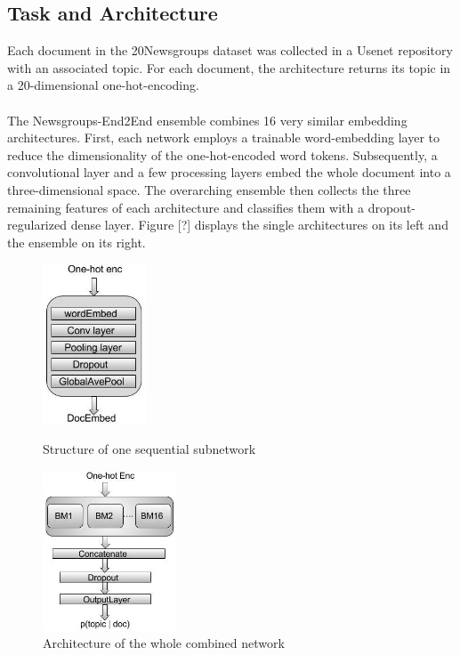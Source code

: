 \subsection*{Task and Architecture}
Each document in the 20Newsgroups dataset was collected in a Usenet repository with an associated topic. For each document, the architecture returns its topic in a 20-dimensional one-hot-encoding.\\
\\
The Newsgroups-End2End ensemble combines 16 very similar embedding architectures. First, each network employs a trainable word-embedding layer to reduce the dimensionality of the one-hot-encoded word tokens. Subsequently, a convolutional layer and a few processing layers embed the whole document into a three-dimensional space. The overarching ensemble then collects the three remaining features of each architecture and classifies them with a dropout-regularized dense layer. Figure [?] displays the single architectures on its left and the ensemble on its right.
\begin{figure}
	\begin{minipage}{0.5\textwidth}
		\centering
		\includegraphics[height=180px]{gfx/4-Design/base_module.png}
		\caption*{Structure of one sequential subnetwork}
		\label{?}
	\end{minipage}\hfill
	\begin{minipage}{0.5\textwidth}
		\centering
		\includegraphics[height=180px]{gfx/4-Design/combined_model.png}
		\caption*{Architecture of the whole combined network}
		\label{?}
	\end{minipage}
\end{figure}

